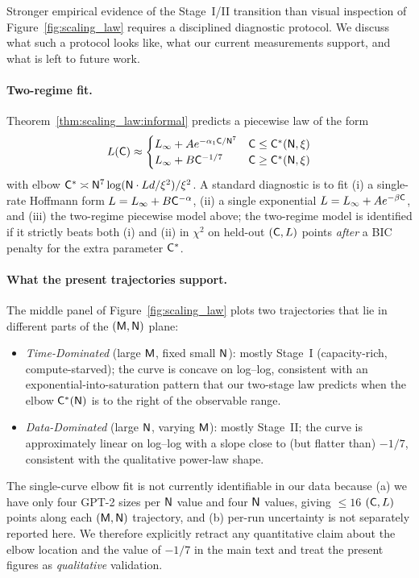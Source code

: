 \documentclass[11pt]{article}
\theoremstyle{plain}
\begin{document}
Stronger empirical evidence of the Stage~I/II transition than visual inspection of Figure~\ref{fig:scaling_law} requires a disciplined diagnostic protocol. We discuss what such a protocol looks like, what our current measurements support, and what is left to future work.

\paragraph{Two-regime fit.}
Theorem~\ref{thm:scaling_law:informal} predicts a piecewise law of the form
\[
L({\sf C}) \approx \begin{cases} L_\infty + A e^{-\alpha_1 {\sf C}/{\sf N}^7} & {\sf C} \le {\sf C}^*({\sf N},\xi) \\ L_\infty + B {\sf C}^{-1/7} & {\sf C} \ge {\sf C}^*({\sf N},\xi) \end{cases}
\]
with elbow ${\sf C}^*\asymp {\sf N}^7 \log({\sf N}\cdot Ld/\xi^2)/\xi^2$. A standard diagnostic is to fit (i) a single-rate Hoffmann form $L = L_\infty + B {\sf C}^{-\alpha}$, (ii) a single exponential $L = L_\infty + A e^{-\beta {\sf C}}$, and (iii) the two-regime piecewise model above; the two-regime model is identified if it strictly beats both (i) and (ii) in $\chi^2$ on held-out $({\sf C}, L)$ points {\it after} a BIC penalty for the extra parameter ${\sf C}^*$.

\paragraph{What the present trajectories support.}
The middle panel of Figure~\ref{fig:scaling_law} plots two trajectories that lie in different parts of the $({\sf M},{\sf N})$ plane:
\begin{itemize}
    \item {\it Time-Dominated} (large ${\sf M}$, fixed small ${\sf N}$): mostly Stage~I (capacity-rich, compute-starved); the curve is concave on log--log, consistent with an exponential-into-saturation pattern that our two-stage law predicts when the elbow ${\sf C}^*({\sf N})$ is to the right of the observable range.
    \item {\it Data-Dominated} (large ${\sf N}$, varying ${\sf M}$): mostly Stage~II; the curve is approximately linear on log--log with a slope close to (but flatter than) $-1/7$, consistent with the qualitative power-law shape.
\end{itemize}
The single-curve elbow fit is not currently identifiable in our data because (a) we have only four GPT-2 sizes per ${\sf N}$ value and four ${\sf N}$ values, giving $\le 16$ $({\sf C},L)$ points along each $({\sf M},{\sf N})$ trajectory, and (b) per-run uncertainty is not separately reported here. We therefore explicitly retract any quantitative claim about the elbow location and the value of $-1/7$ in the main text and treat the present figures as {\it qualitative} validation.
\end{document}
